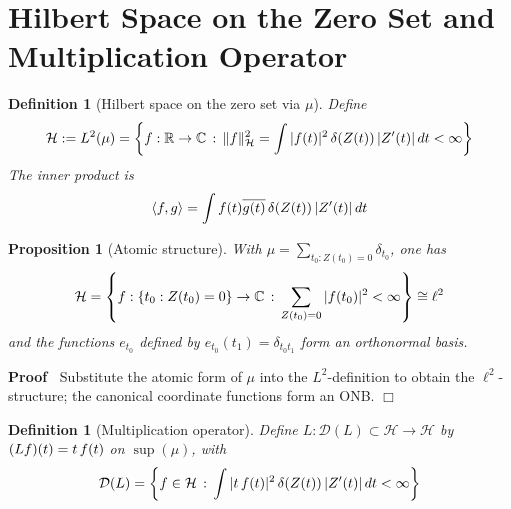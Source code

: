 \documentclass{article}
\newcommand{\assign}{:=}
\newenvironment{proof}{\noindent\textbf{Proof\ }}{\hspace*{\fill}$\Box$\medskip}
\newtheorem{definition}{Definition}
\newcounter{nndefinition}
\newtheorem{definition*}[nndefinition]{Definition}
\newtheorem{proposition}{Proposition}
{\theorembodyfont{\rmfamily}\newtheorem{remark}{Remark}}
\begin{document}
\section{Hilbert Space on the Zero Set and Multiplication Operator}

\begin{definition*}
  [Hilbert space on the zero set via $\mu$] Define
  \begin{equation}
    \mathcal{H} \assign L^2 (\mu) = \left\{ f : \mathbb{R} \to \mathbb{C}
    \hspace{0.17em} : \hspace{0.17em} \|f\|_{\mathcal{H}}^2 = \int |f (t) |^2 
    \hspace{0.17em} \delta (Z (t)) \hspace{0.17em} |Z' (t) | \hspace{0.17em}
    dt < \infty \right\}
  \end{equation}
  The inner product is
  \begin{equation}
    \langle f, g \rangle = \int f (t) \overline{g (t)} \hspace{0.17em} \delta
    (Z (t)) \hspace{0.17em} |Z' (t) |  \hspace{0.17em} dt
  \end{equation}
\end{definition*}

\begin{proposition}
  [Atomic structure] With $\mu = \sum_{t_0 : Z (t_0) = 0} \delta_{t_0}$, one
  has
  \begin{equation}
    \mathcal{H}= \left\{ f : \{t_0 : Z (t_0) = 0\} \to \mathbb{C}
    \hspace{0.17em} : \hspace{0.17em} \sum_{Z (t_0) = 0} |f (t_0) |^2 < \infty
    \right\} \cong \ell^2
  \end{equation}
  and the functions $e_{t_0}$ defined by $e_{t_0} (t_1) = \delta_{t_0 t_1}$
  form an orthonormal basis.
\end{proposition}

\begin{proof}
  Substitute the atomic form of $\mu$ into the $L^2$-definition to obtain the
  $\ell^2$-structure; the canonical coordinate functions form an ONB.
\end{proof}

\begin{definition}
  [Multiplication operator] Define $L : \mathcal{D} (L) \subset \mathcal{H}
  \to \mathcal{H}$ by $(Lf) (t) = t \hspace{0.17em} f (t)$ on $\sup (\mu)$,
  with
  \begin{equation}
    \mathcal{D} (L) = \left\{ f \in \mathcal{H} \hspace{0.17em} :
    \hspace{0.17em} \int |t \hspace{0.17em} f (t) |^2  \hspace{0.17em} \delta
    (Z (t)) \hspace{0.17em} |Z' (t) | \hspace{0.17em} dt < \infty \right\}
  \end{equation}
\end{definition}
\end{document}

